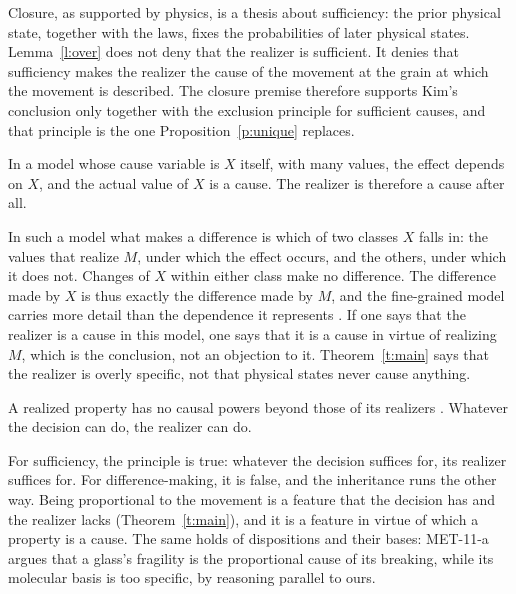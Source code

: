 \documentclass{situationist-preprint}
\begin{document}
\begin{reply}
Closure, as supported by physics, is a thesis about sufficiency: the prior physical state, together with the laws, fixes the probabilities of later physical states. Lemma~\ref{l:over} does not deny that the realizer is sufficient. It denies that sufficiency makes the realizer the cause of the movement at the grain at which the movement is described. The closure premise therefore supports Kim's conclusion only together with the exclusion principle for sufficient causes, and that principle is the one Proposition~\ref{p:unique} replaces.
\end{reply}

\begin{objection}
In a model whose cause variable is $X$ itself, with many values, the effect depends on $X$, and the actual value of $X$ is a cause. The realizer is therefore a cause after all.
\end{objection}

\begin{reply}
In such a model what makes a difference is which of two classes $X$ falls in: the values that realize $M$, under which the effect occurs, and the others, under which it does not. Changes of $X$ within either class make no difference. The difference made by $X$ is thus exactly the difference made by $M$, and the fine-grained model carries more detail than the dependence it represents \citep{Woodward2010}. If one says that the realizer is a cause in this model, one says that it is a cause in virtue of realizing $M$, which is the conclusion, not an objection to it. Theorem~\ref{t:main} says that the realizer is overly specific, not that physical states never cause anything.
\end{reply}

\begin{objection}
A realized property has no causal powers beyond those of its realizers \citep{Kim1998}. Whatever the decision can do, the realizer can do.
\end{objection}

\begin{reply}
For sufficiency, the principle is true: whatever the decision suffices for, its realizer suffices for. For difference-making, it is false, and the inheritance runs the other way. Being proportional to the movement is a feature that the decision has and the realizer lacks (Theorem~\ref{t:main}), and it is a feature in virtue of which a property is a cause. The same holds of dispositions and their bases: MET-11-a argues that a glass's fragility is the proportional cause of its breaking, while its molecular basis is too specific, by reasoning parallel to ours.
\end{reply}
\end{document}
